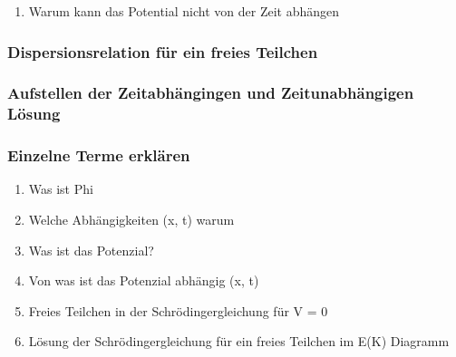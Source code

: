 \begin{enumerate}
    \item Warum kann das Potential nicht von der Zeit abhängen
\end{enumerate}

\subsubsection{Dispersionsrelation für ein freies Teilchen}

\subsubsection{Aufstellen der Zeitabhängingen und Zeitunabhängigen Lösung}

\subsubsection{Einzelne Terme erklären}
\begin{enumerate}
    \item Was ist Phi
    \item Welche Abhängigkeiten (x, t) warum
    \item Was ist das Potenzial?
    \item Von was ist das Potenzial abhängig (x, t)
    \item Freies Teilchen in der Schrödingergleichung für V = 0
    \item Lösung der Schrödingergleichung für ein freies Teilchen im E(K) Diagramm
\end{enumerate}